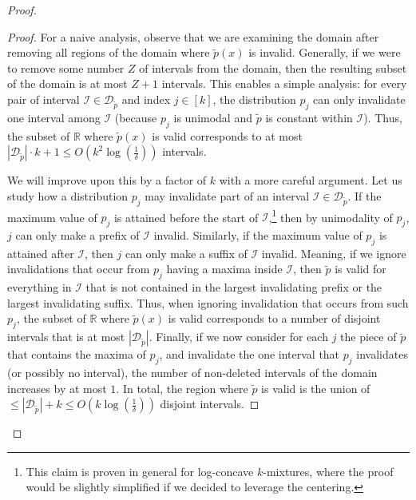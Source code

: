 \begin{proof}
\begin{proof}
     For a naive analysis, observe that we are examining the domain after removing all regions of the domain where $\tilde{p}(x)$ is invalid.
     Generally, if we were to remove some number $Z$ of intervals from the domain, then the resulting subset of the domain is at most $Z+1$ intervals.
     This enables a simple analysis: for every pair of interval $\mathcal{I} \in \mathcal{D}_{\tilde{p}}$ and index $j \in [k]$, the distribution $p_j$ can only invalidate one interval among $\mathcal{I}$ (because $p_j$ is unimodal and $\tilde{p}$ is constant within $\mathcal{I}$).
     Thus, the subset of $\mathbb{R}$ where $\tilde{p}(x)$ is valid corresponds to at most $|\mathcal{D}_{\tilde{p}}| \cdot k + 1 \le O(k^2 \log(\frac{1}{\delta}))$ intervals.
     
     We will improve upon this by a factor of $k$ with a more careful argument.
     Let us study how a distribution $p_j$ may invalidate part of an interval $\mathcal{I} \in \mathcal{D}_{\tilde{p}}$.
     If the maximum value of $p_j$ is attained before the start of $\mathcal{I}$,\footnote{This claim is proven in general for log-concave $k$-mixtures, where the proof would be slightly simplified if we decided to leverage the centering.}
     then by unimodality of $p_j$, $j$ can only make a prefix of $\mathcal{I}$ invalid.
     Similarly, if the maximum value of $p_j$ is attained after $\mathcal{I}$, then $j$ can only make a suffix of $\mathcal{I}$ invalid.
     Meaning, if we ignore invalidations that occur from $p_j$ having a maxima inside $\mathcal{I}$, then $\tilde{p}$ is valid for everything in $\mathcal{I}$ that is not contained in the largest invalidating prefix or the largest invalidating suffix.
     Thus, when ignoring invalidation that occurs from such $p_j$, the subset of $\mathbb{R}$ where $\tilde{p}(x)$ is valid corresponds to a number of disjoint intervals that is at most $|\mathcal{D}_{\tilde{p}}|$.
     Finally, if we now consider for each $j$ the piece of $\tilde{p}$ that contains the maxima of $p_j$, and invalidate the one interval that $p_j$ invalidates (or possibly no interval), the number of non-deleted intervals of the domain increases by at most $1$.
 In total, the region where $\tilde{p}$ is valid is the union of $\le |\mathcal{D}_{\tilde{p}}| + k \le O(k \log(\frac{1}{\delta}))$ disjoint intervals.

 \end{proof}


\end{proof}
